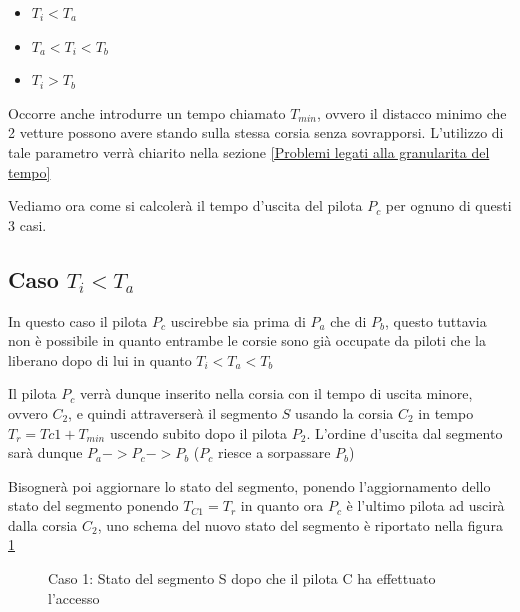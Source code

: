 \documentclass[a4paper,11pt, twoside]{book}
\begin{document}
      \begin{itemize}
	\item $T_i < T_a$
	\item $T_a < T_i < T_b$
	\item $T_i > T_b$
      \end{itemize}
      
      Occorre anche introdurre un tempo chiamato $T_{min}$, ovvero il distacco minimo che 2 vetture possono avere
      stando sulla stessa corsia senza sovrapporsi. L'utilizzo di tale parametro verrà chiarito nella sezione
      \ref{Problemi legati alla granularita del tempo}
      
      Vediamo ora come si calcolerà il tempo d'uscita del pilota $P_c$ per ognuno di questi 3 casi.
      
      \subsection{Caso $T_i < T_a$}
	In questo caso il pilota $P_c$ uscirebbe sia prima di $P_a$ che di $P_b$, questo tuttavia non è possibile in quanto
	entrambe le corsie sono già occupate da piloti che la liberano dopo di lui in quanto $T_i < T_a < T_b$
	
	Il pilota $P_{c}$ verrà dunque inserito nella corsia con il tempo di uscita minore, ovvero $C_2$,
	e quindi attraverserà il segmento $S$ usando la corsia $C_2$ in tempo $T_r = T{c1} + T_{min}$
	uscendo subito dopo il pilota $P_2$. L'ordine d'uscita dal segmento sarà dunque $P_a -> P_c -> P_b$
	($P_c$ riesce a sorpassare $P_b$)
	
	Bisognerà poi aggiornare lo stato del segmento, ponendo l'aggiornamento dello stato del segmento ponendo
	$T_{C1} = T_{r}$ in quanto ora $P_c$ è l'ultimo pilota ad uscirà dalla corsia $C_2$, uno schema del
	nuovo stato del segmento è riportato nella figura \ref{fgr:AccessoSegmentiCaso1}
	
	\begin{figure}[h]
	  \centering
	  \caption{Caso 1: Stato del segmento S dopo che il pilota C ha effettuato l'accesso}
	  \label{fgr:AccessoSegmentiCaso1}
	\end{figure}
	
\end{document}

